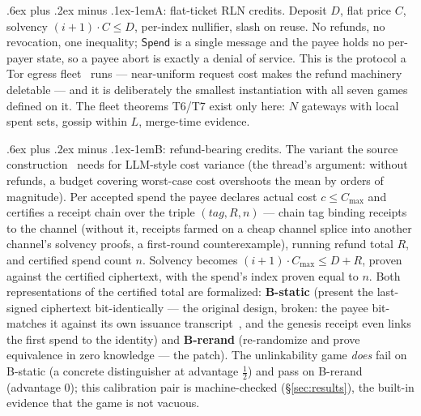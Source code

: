 \documentclass[9pt]{extarticle}
\makeatletter
\renewcommand\paragraph{\@startsection{paragraph}{4}{0pt}%
  {.6ex plus .2ex minus .1ex}{-1em}{\normalfont\normalsize\bfseries}}
\newcommand{\Cmax}{C_{\max}}
\makeatother
\begin{document}
\paragraph{A: flat-ticket RLN credits.} Deposit $D$, flat price $C$,
solvency $(i+1) \cdot C \le D$, per-index nullifier, slash on reuse. No
refunds, no revocation, one inequality; $\mathsf{Spend}$ is a single
message and the payee holds no per-payer state, so a payee abort is
exactly a denial of service. This is the protocol a Tor egress
fleet~\cite{egresspost2026} runs --- near-uniform request cost makes the
refund machinery deletable --- and it is deliberately the smallest
instantiation with all seven games defined on it. The fleet theorems
T6/T7 exist only here: $N$ gateways with local spent sets, gossip within
$L$, merge-time evidence.

\paragraph{B: refund-bearing credits.} The variant the source
construction~\cite{crapisbuterin2026credits} needs for LLM-style cost
variance (the thread's argument: without refunds, a budget covering
worst-case cost overshoots the mean by orders of magnitude). Per accepted
spend the payee declares actual cost $c \le \Cmax$ and certifies a receipt
chain over the triple $(tag, R, n)$ --- chain tag binding receipts to the
channel (without it, receipts farmed on a cheap channel splice into
another channel's solvency proofs, a first-round counterexample), running
refund total $R$, and certified spend count $n$. Solvency becomes
$(i+1) \cdot \Cmax \le D + R$, proven against the certified ciphertext,
with the spend's index proven equal to $n$. Both representations of the
certified total are formalized: \textbf{B-static} (present the last-signed
ciphertext bit-identically --- the original design, broken: the payee
bit-matches it against its own issuance transcript~\cite{omarespejel2026},
and the genesis receipt even links the first spend to the identity) and
\textbf{B-rerand} (re-randomize and prove equivalence in zero knowledge
--- the patch). The unlinkability game \emph{does} fail on B-static (a
concrete distinguisher at advantage $\tfrac12$) and pass on B-rerand
(advantage $0$); this calibration pair is machine-checked
(\S\ref{sec:results}), the built-in evidence that the game is not vacuous.
\end{document}
